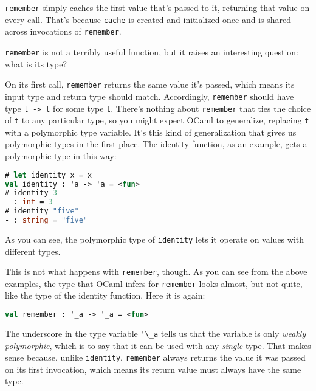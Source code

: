 \passthrough{\lstinline!remember!} simply caches the first value that's
passed to it, returning that value on every call. That's because
\passthrough{\lstinline!cache!} is created and initialized once and is
shared across invocations of \passthrough{\lstinline!remember!}.

\passthrough{\lstinline!remember!} is not a terribly useful function,
but it raises an interesting question: what is its type?

On its first call, \passthrough{\lstinline!remember!} returns the same
value it's passed, which means its input type and return type should
match. Accordingly, \passthrough{\lstinline!remember!} should have type
\passthrough{\lstinline!t -> t!} for some type
\passthrough{\lstinline!t!}. There's nothing about
\passthrough{\lstinline!remember!} that ties the choice of
\passthrough{\lstinline!t!} to any particular type, so you might expect
OCaml to generalize, replacing \passthrough{\lstinline!t!} with a
polymorphic type variable. It's this kind of generalization that gives
us polymorphic types in the first place. The identity function, as an
example, gets a polymorphic type in this way:

\begin{lstlisting}[language=Caml]
# let identity x = x
val identity : 'a -> 'a = <fun>
# identity 3
- : int = 3
# identity "five"
- : string = "five"
\end{lstlisting}

As you can see, the polymorphic type of
\passthrough{\lstinline!identity!} lets it operate on values with
different types.

This is not what happens with \passthrough{\lstinline!remember!},
though. As you can see from the above examples, the type that OCaml
infers for \passthrough{\lstinline!remember!} looks almost, but not
quite, like the type of the identity function. Here it is again:

\begin{lstlisting}[language=Caml]
val remember : '_a -> '_a = <fun>
\end{lstlisting}

The underscore in the type variable \passthrough{\lstinline!'\_a!} tells
us that the variable is only \emph{weakly polymorphic}, which is to say
that it can be used with any \emph{single} type. That makes sense
because, unlike \passthrough{\lstinline!identity!},
\passthrough{\lstinline!remember!} always returns the value it was
passed on its first invocation, which means its return value must always
have the same type. 

